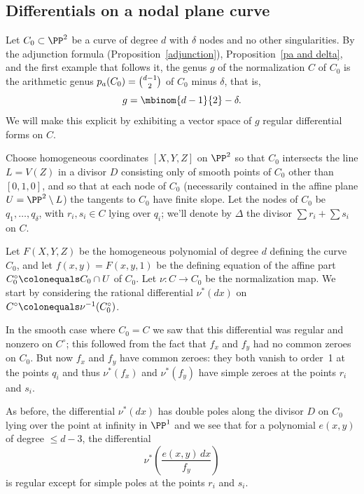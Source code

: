 \subsection{Differentials on a nodal plane curve}\label{canonical series on nodal plane curves}

Let $C_{0} \subset \PP^2$  be a curve of degree $d$ with $\delta$
nodes and no other singularities. By the 
adjunction formula
%
%
%
 (Proposition~\ref{adjunction}), 
Proposition~\ref{pa and delta}, and the first example that follows it, 
the genus $g$ of the normalization $C$ of $C_{0}$ is
the arithmetic genus $p_{a}(C_{0}) = \tbinom{d-1}{2}$ 
of $C_{0}$ minus $\delta$, that is,
$$
g = \mbinom{d-1}{2} -\delta.
$$
We will make this explicit by 
%
%
exhibiting a vector space of $g$ regular differential forms on $C$.

Choose homogeneous coordinates  $[X,Y,Z]$ on $\PP^2$ so that
$C_0$ intersects the line $L = V(Z)$ in a divisor $D$ consisting only
of smooth points of $C_{0}$  other than $[0,1,0]$, and 
so that at each node of $C_0$ (necessarily contained in the affine plane $U = \PP^2 \setminus L$) the tangents to $C_0$ have finite slope.
Let the nodes of $C_0$ be $q_1,\dots,q_\delta$, with $r_i, s_i \in C$ lying 
over $q_i$; we'll denote by $\Delta$ the divisor $\sum r_i + \sum s_i$ on $C$. 

Let $F(X,Y,Z)$ be the homogeneous polynomial of degree $d$ defining
the curve $C_0$, and let $f(x,y) = F(x,y,1)$ be the defining equation
of the affine part $C_{0}^{\circ}\colonequals  C_0 \cap U$ of $C_0$.
Let $\nu: C\to C_0$ be the normalization map. We start by considering
the rational differential 
%
$\nu^*(dx)$ on 
$C^{\circ}\colonequals  \nu^{-1}(C_{0}^{\circ})$. 

In the smooth case where $C_{0}=C$ we saw that this differential was
regular and nonzero on $C^{\circ}$; this followed from the fact 
that $f_{x}$ and $f_{y}$ had no common zeroes on $C_0$. But now
$f_{x}$ and $f_{y}$ have common zeroes: they both vanish to order~1 at
the points $q_{i}$ and thus $\nu^*(f_{x})$ and $\nu^*(f_{y})$ have
simple zeroes at the points $r_i$ and $s_i$.

As before, the differential $\nu^*(dx)$ 
has  double poles along the divisor
$D$ on $C_{0}$ lying over the point at infinity in $\PP^{1}$
and we see that for a polynomial $e(x,y)$ of degree $\leq d-3$, the
differential
$$
\nu^*\left( \frac{e(x,y)\,dx}{f_{y}}\right)
$$
is regular except for simple poles at the points $r_i$ and $s_i$.

